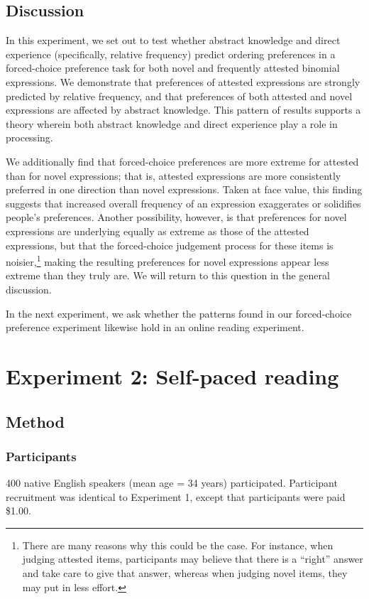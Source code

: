 \documentclass[authoryear]{elsarticle}
\begin{document}
\subsection{Discussion}\label{fc-discuss}
In this experiment, we set out to test whether abstract knowledge and direct experience (specifically, relative frequency) predict ordering preferences in a forced-choice preference task for both novel and frequently attested binomial expressions. We demonstrate that preferences of attested expressions are strongly predicted by relative frequency, and that preferences of both attested and novel expressions are affected by abstract knowledge. This pattern of results supports a theory wherein both abstract knowledge and direct experience play a role in processing.

We additionally find that forced-choice preferences are more extreme for attested than for novel expressions; that is, attested expressions are more consistently preferred in one direction than novel expressions. Taken at face value, this finding suggests that increased overall frequency of an expression exaggerates or solidifies people's preferences. Another possibility, however, is that preferences for novel expressions are underlying equally as extreme as those of the attested expressions, but that the forced-choice judgement process for these items is noisier,\footnote{There are many reasons why this could be the case. For instance, when judging attested items, participants may believe that there is a ``right'' answer and take care to give that answer, whereas when judging novel items, they may put in less effort.} making the resulting preferences for novel expressions appear less extreme than they truly are. We will return to this question in the general discussion.


In the next experiment, we ask whether the patterns found in our forced-choice preference experiment likewise hold in an online reading experiment.


\section{Experiment 2: Self-paced reading}\label{expt2}
\subsection{Method}
\subsubsection{Participants}
400 native English speakers (mean age = 34 years) participated. Participant recruitment was identical to Experiment 1, except that participants were paid \$1.00.
\end{document}

